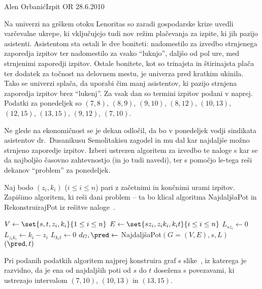 \begin{naloga}{Alen Orbanić}{Izpit OR 28.6.2010}
\begin{vprasanje}
Na univerzi na grškem otoku Lenoritas
so zaradi gospodarske krize uvedli varčevalne ukrepe,
ki vključujejo tudi nov režim plačevanja za izpite,
ki jih pazijo asistenti.
Asistentom sta ostali le dve boniteti:
nadomestilo za izvedbo strnjenega zaporedja izpitov
ter nadomestilo za vsako ``luknjo'', daljšo od pol ure,
med strnjenimi zaporedji izpitov.
Ostale bonitete,
kot so trinajsta in štirinajsta plača
ter dodatek za točnost na delovnem mestu,
je univerza pred kratkim ukinila.
Tako se univerzi splača, da uporabi čim manj asistentov,
ki pazijo strnjena zaporedja izpitov brez ``lukenj''.
Za vsak dan so termini izpitov podani v naprej.
Podatki za ponedeljek so $(7, 8)$, $(8, 9)$, $(9, 10)$, $(8, 12)$,
$(10, 13)$, $(12, 15)$, $(13, 15)$, $(9, 12)$, $(7, 10)$.

Ne glede na ekonomičnost se je dekan odločil,
da bo v ponedeljek vodji sindikata asistentov dr.~Dusanikusu Semolitakisu
zagodel in mu dal kar najdaljše možno strnjeno zaporedje izpitov.
Izberi ustrezen algoritem za izvedbo te naloge
s kar se da najboljšo časovno zahtevnostjo (in jo tudi navedi),
ter s pomočjo le-tega reši dekanov ``problem'' za ponedeljek.

\end{vprasanje}

\begin{odgovor}
Naj bodo $(z_i, k_i)$ ($i \le i \le n$)
pari z začetnimi in končnimi urami izpitov.
Zapišimo algoritem, ki reši dani problem
-- ta bo klical algoritma {\sc NajdaljšaPot} in {\sc RekonstruirajPot}
iz rešitve naloge~\res[topo].
\begin{small}
\begin{algorithmic}
    \State $V \gets \set{s, t, z_i, k_i}{1 \le i \le n}$
    \State $E \gets \set{s z_i, z_i k_i, k_i t}{i \le i \le n}$
        \State $L_{s z_i} \gets 0$
        \State $L_{z_i k_i} \gets k_i - z_i$
        \State $L_{k_i t} \gets 0$
    \EndFor
    \State $d_G, \pred \gets$ {\sc NajdaljšaPot}$(G = (V, E), s, L)$
    \State {}$(\pred, t)$
\EndFunction
\end{algorithmic}
\end{small}

Pri podanih podatkih algoritem najprej konstruira graf s slike~\fig,
iz katerega je razvidno,
da je ena od najdaljših poti od $s$ do $t$ dosežena s povezavami,
ki ustrezajo intervalom $(7, 10)$, $(10, 13)$ in $(13, 15)$.

\begin{slika}
\pgfslika
{}
\end{slika}
\end{odgovor}
\end{naloga}
